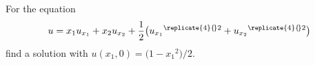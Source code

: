 \begin{problem}
  For the equation
  \[
    u=x_1u_{x_1}+x_2u_{x_2}
    +\frac{1}{2}\bigl({u_{x_1}}^{\replicate{4}{\!}2}+{u_{x_2}}^{\replicate{4}{\!}2}\bigr)
  \]
  find a solution with \(u(x_1,0)=\bigl(1-{x_1}^{\!2}\bigr)/2\).
\end{problem}
\begin{solution}

\end{solution}

